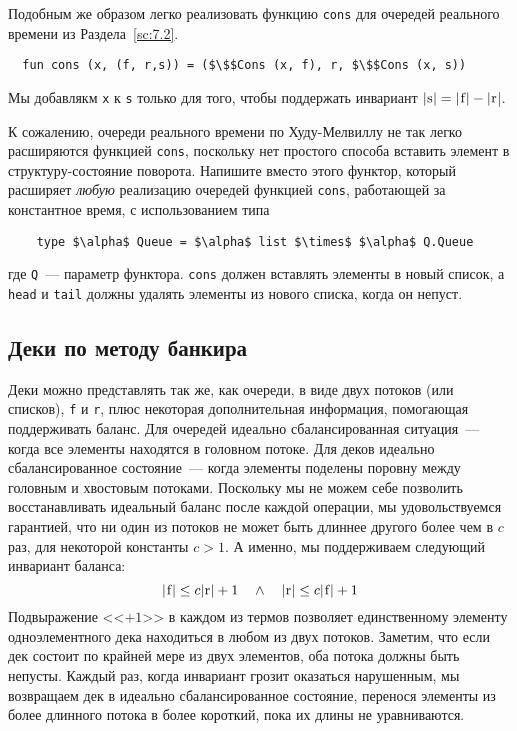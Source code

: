 Подобным же образом легко реализовать функцию \lstinline!cons! для
очередей реального времени из Раздела~\ref{sc:7.2}.
\begin{lstlisting}
  fun cons (x, (f, r,s)) = ($\$$Cons (x, f), r, $\$$Cons (x, s))
\end{lstlisting}
Мы добавлякм \lstinline!x! к \lstinline!s! только для того, чтобы
поддержать инвариант $|\lstinline!s!| = |\lstinline!f!| - |\lstinline!r!$|.

\begin{exercise}\label{ex:8.4}
  К сожалению, очереди реального времени по Худу-Мелвиллу не так легко
  расширяются функцией \lstinline!cons!, поскольку нет простого
  способа вставить элемент в структуру-состояние поворота. Напишите
  вместо этого функтор, который расширяет \emph{любую} реализацию
  очередей функцией \lstinline!cons!, работающей за константное время,
  с использованием типа
  \begin{lstlisting}
    type $\alpha$ Queue = $\alpha$ list $\times$ $\alpha$ Q.Queue
  \end{lstlisting}
  где \lstinline!Q!~--- параметр функтора. \lstinline!cons! должен
  вставлять элементы в новый список, а \lstinline!head! и
  \lstinline!tail! должны удалять элементы из нового списка, когда он
  непуст.
\end{exercise}

\subsection{Деки по методу банкира}
\label{sc:8.4.2}

Деки можно представлять так же, как очереди, в виде двух потоков (или списков),
\lstinline!f! и \lstinline!r!, плюс некоторая дополнительная
информация, помогающая поддерживать баланс. Для очередей идеально
сбалансированная ситуация~--- когда все элементы находятся в головном
потоке. Для деков идеально сбалансированное состояние~--- когда
элементы поделены поровну между головным и хвостовым
потоками. Поскольку мы не можем себе позволить восстанавливать
идеальный баланс после каждой операции, мы удовольствуемся гарантией,
что ни один из потоков не может быть длиннее другого более чем в $c$
раз, для некоторой константы $c > 1$. А именно, мы поддерживаем
следующий инвариант баланса:
$$
  |\lstinline!f!| \le c |\lstinline!r!| + 1 \quad \land \quad 
  |\lstinline!r!| \le c |\lstinline!f!| + 1
$$
Подвыражение <<$+1$>> в каждом из термов позволяет единственному
элементу одноэлементного дека находиться в любом из двух
потоков. Заметим, что если дек состоит по крайней мере из двух
элементов, оба потока должны быть непусты. Каждый раз, когда инвариант
грозит оказаться нарушенным, мы возвращаем дек в идеально
сбалансированное состояние, перенося элементы из более длинного потока
в более короткий, пока их длины не уравниваются.

